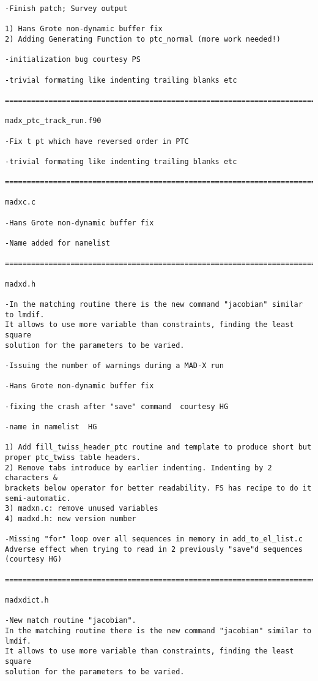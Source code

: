 \begin{verbatim}
-Finish patch; Survey output

1) Hans Grote non-dynamic buffer fix
2) Adding Generating Function to ptc_normal (more work needed!)

-initialization bug courtesy PS

-trivial formating like indenting trailing blanks etc

=============================================================================

madx_ptc_track_run.f90

-Fix t pt which have reversed order in PTC

-trivial formating like indenting trailing blanks etc

=============================================================================

madxc.c

-Hans Grote non-dynamic buffer fix

-Name added for namelist

=============================================================================

madxd.h

-In the matching routine there is the new command "jacobian" similar to lmdif.
It allows to use more variable than constraints, finding the least square
solution for the parameters to be varied.

-Issuing the number of warnings during a MAD-X run

-Hans Grote non-dynamic buffer fix

-fixing the crash after "save" command  courtesy HG

-name in namelist  HG

1) Add fill_twiss_header_ptc routine and template to produce short but
proper ptc_twiss table headers.
2) Remove tabs introduce by earlier indenting. Indenting by 2 characters &
brackets below operator for better readability. FS has recipe to do it
semi-automatic.
3) madxn.c: remove unused variables
4) madxd.h: new version number

-Missing "for" loop over all sequences in memory in add_to_el_list.c
Adverse effect when trying to read in 2 previously "save"d sequences
(courtesy HG)

=============================================================================

madxdict.h

-New match routine "jacobian".
In the matching routine there is the new command "jacobian" similar to lmdif.
It allows to use more variable than constraints, finding the least square
solution for the parameters to be varied.


\end{verbatim}
